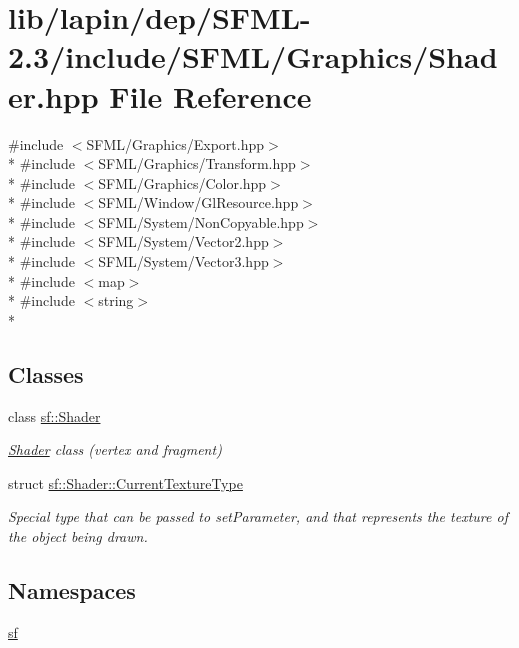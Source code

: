 \hypertarget{lapin_2dep_2_s_f_m_l-2_83_2include_2_s_f_m_l_2_graphics_2_shader_8hpp}{\section{lib/lapin/dep/\-S\-F\-M\-L-\/2.3/include/\-S\-F\-M\-L/\-Graphics/\-Shader.hpp File Reference}
\label{lapin_2dep_2_s_f_m_l-2_83_2include_2_s_f_m_l_2_graphics_2_shader_8hpp}
}
{\ttfamily \#include $<$S\-F\-M\-L/\-Graphics/\-Export.\-hpp$>$}\\*
{\ttfamily \#include $<$S\-F\-M\-L/\-Graphics/\-Transform.\-hpp$>$}\\*
{\ttfamily \#include $<$S\-F\-M\-L/\-Graphics/\-Color.\-hpp$>$}\\*
{\ttfamily \#include $<$S\-F\-M\-L/\-Window/\-Gl\-Resource.\-hpp$>$}\\*
{\ttfamily \#include $<$S\-F\-M\-L/\-System/\-Non\-Copyable.\-hpp$>$}\\*
{\ttfamily \#include $<$S\-F\-M\-L/\-System/\-Vector2.\-hpp$>$}\\*
{\ttfamily \#include $<$S\-F\-M\-L/\-System/\-Vector3.\-hpp$>$}\\*
{\ttfamily \#include $<$map$>$}\\*
{\ttfamily \#include $<$string$>$}\\*
\subsection*{Classes}
\begin{DoxyCompactItemize}
\item 
class \hyperlink{classsf_1_1_shader}{sf\-::\-Shader}
\begin{DoxyCompactList}\small\item\em \hyperlink{classsf_1_1_shader}{Shader} class (vertex and fragment) \end{DoxyCompactList}\item 
struct \hyperlink{structsf_1_1_shader_1_1_current_texture_type}{sf\-::\-Shader\-::\-Current\-Texture\-Type}
\begin{DoxyCompactList}\small\item\em Special type that can be passed to set\-Parameter, and that represents the texture of the object being drawn. \end{DoxyCompactList}\end{DoxyCompactItemize}
\subsection*{Namespaces}
\begin{DoxyCompactItemize}
\item 
\hyperlink{namespacesf}{sf}
\end{DoxyCompactItemize}
